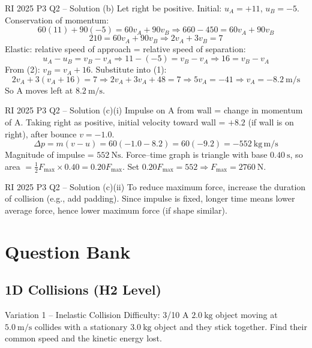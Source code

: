\documentclass[11pt]{beamer}
\begin{document}
\begin{frame}[shrink=15]{RI 2025 P3 Q2 – Solution (b)}
Let right be positive. Initial: $u_A = +11$, $u_B = -5$.
Conservation of momentum:
\[ 60(11) + 90(-5) = 60 v_A + 90 v_B \Rightarrow 660 - 450 = 60 v_A + 90 v_B \]
\[ 210 = 60 v_A + 90 v_B \Rightarrow 2 v_A + 3 v_B = 7 \tag{1} \]
Elastic: relative speed of approach = relative speed of separation:
\[ u_A - u_B = v_B - v_A \Rightarrow 11 - (-5) = v_B - v_A \Rightarrow 16 = v_B - v_A \tag{2} \]
From (2): $v_B = v_A + 16$. Substitute into (1):
\[ 2 v_A + 3(v_A + 16) = 7 \Rightarrow 2v_A + 3v_A + 48 = 7 \Rightarrow 5v_A = -41 \Rightarrow v_A = -8.2\ \mathrm{m/s} \]
So A moves left at $8.2\ \mathrm{m/s}$.
\end{frame}

\begin{frame}[shrink=15]{RI 2025 P3 Q2 – Solution (c)(i)}
Impulse on A from wall = change in momentum of A. Taking right as positive, initial velocity toward wall = $+8.2$ (if wall is on right), after bounce $v = -1.0$.
\[ \Delta p = m(v - u) = 60(-1.0 - 8.2) = 60(-9.2) = -552\ \mathrm{kg\,m/s} \]
Magnitude of impulse = $552\ \mathrm{Ns}$. Force–time graph is triangle with base $0.40\ \mathrm{s}$, so area $= \frac12 F_{\max} \times 0.40 = 0.20 F_{\max}$.
Set $0.20 F_{\max} = 552 \Rightarrow F_{\max} = 2760\ \mathrm{N}$.
\end{frame}

\begin{frame}{RI 2025 P3 Q2 – Solution (c)(ii)}
To reduce maximum force, increase the duration of collision (e.g., add padding). Since impulse is fixed, longer time means lower average force, hence lower maximum force (if shape similar).
\end{frame}

\section{Question Bank}

\subsection{1D Collisions (H2 Level)}

\begin{frame}[shrink=15]{Variation 1 – Inelastic Collision \hfill Difficulty: 3/10}
A $2.0\ \mathrm{kg}$ object moving at $5.0\ \mathrm{m/s}$ collides with a stationary $3.0\ \mathrm{kg}$ object and they stick together. Find their common speed and the kinetic energy lost.
\end{frame}
\end{document}
